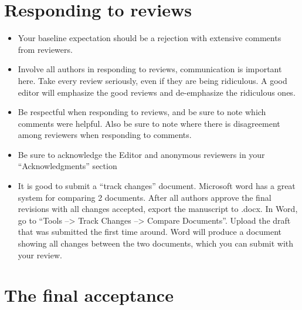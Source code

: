 \documentclass[
  letterpaper,
  DIV=11,
  numbers=noendperiod]{scrreprt}
\begin{document}
\hypertarget{responding-to-reviews}{%
\section*{\texorpdfstring{\textbf{Responding to
reviews}}{Responding to reviews}}\label{responding-to-reviews}}

\begin{itemize}
\item
  Your baseline expectation should be a rejection with extensive
  comments from reviewers.
\item
  Involve all authors in responding to reviews, communication is
  important here. Take every review seriously, even if they are being
  ridiculous. A good editor will emphasize the good reviews and
  de-emphasize the ridiculous ones.
\item
  Be respectful when responding to reviews, and be sure to note which
  comments were helpful. Also be sure to note where there is
  disagreement among reviewers when responding to comments.
\item
  Be sure to acknowledge the Editor and anonymous reviewers in your
  ``Acknowledgments'' section
\item
  It is good to submit a ``track changes'' document. Microsoft word has
  a great system for comparing 2 documents. After all authors approve
  the final revisions with all changes accepted, export the manuscript
  to .docx. In Word, go to ``Tools --\textgreater{} Track Changes
  --\textgreater{} Compare Documents''. Upload the draft that was
  submitted the first time around. Word will produce a document showing
  all changes between the two documents, which you can submit with your
  review.
\end{itemize}

\hypertarget{the-final-acceptance}{%
\section*{\texorpdfstring{\textbf{The final
acceptance}}{The final acceptance}}\label{the-final-acceptance}}
\end{document}

